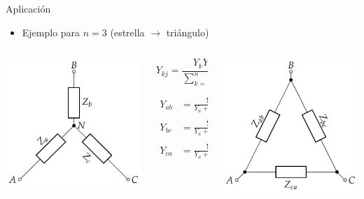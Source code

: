 \documentclass[aspectratio=169, usenames,svgnames,dvipsnames]{beamer}
\begin{document}
\begin{frame}[label={sec:org693f2b0}]{Aplicación}
\begin{itemize}
\item Ejemplo para \(n = 3\) (estrella \(\rightarrow\) triángulo)
\end{itemize}

\begin{columns}
\begin{column}{0.3\columnwidth}
\begin{center}
\includegraphics[height=0.5\textheight]{../figs/Impedancia_Estrella.pdf}
\end{center}
\end{column}

\begin{column}{0.3\columnwidth}
\[
  \boxed{Y_{kj} = \frac{Y_k Y_j}{\sum_{k  = 1}^n Y_k}}
\]

\begin{align*}
  Y_{ab} &= \frac{Y_a Y_b}{Y_a + Y_b + Y_c}\\
  \\
  Y_{bc} &= \frac{Y_b Y_c}{Y_a + Y_b + Y_c}\\
  \\
  Y_{ca} &= \frac{Y_c Y_a}{Y_a + Y_b + Y_c}\\
\end{align*}
\end{column}
\begin{column}{0.3\columnwidth}
\begin{center}
\includegraphics[height=0.5\textheight]{../figs/Impedancia_Triangulo.pdf}
\end{center}
\end{column}
\end{columns}
\end{frame}
\end{document}
